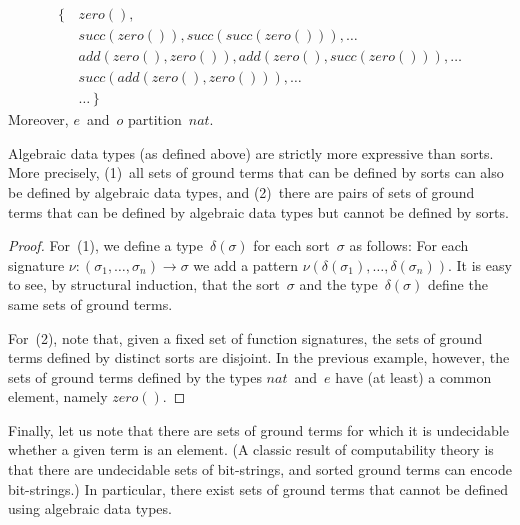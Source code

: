 \documentclass[a4paper,12pt,oneside,fleqn]{book} %
\newcommand{\rg}[1]{\marginpar{\tiny\raggedright\textcolor{blue}{\bf rg:} #1}}
\renewcommand{\rg}{}
\begin{document}
\begin{equation}
\begin{aligned}
\{\,&\mathit{zero}(), \\
    &\mathit{succ}(\mathit{zero}()),
        \mathit{succ}(\mathit{succ}(\mathit{zero}())), \ldots \\
    &\mathit{add}(\mathit{zero}(), \mathit{zero}()),
        \mathit{add}(\mathit{zero}(), \mathit{succ}(\mathit{zero}())),
        \ldots \\
    &\mathit{succ}(\mathit{add}(\mathit{zero}(), \mathit{zero}())),
        \ldots \\
    &\ldots\, \}
\end{aligned}
\end{equation}
Moreover, $e$~and~$o$ partition~$\mathit{nat}$.

\begin{proposition}
Algebraic data types (as defined above) are strictly more expressive than
sorts. More precisely, (1)~all sets of ground terms that can be defined by
sorts can also be defined by algebraic data types, and (2)~there are pairs
of sets of ground terms that can be defined by algebraic data types but
cannot be defined by sorts.
\end{proposition}

\begin{proof}
For~(1), we define a type~$\delta(\sigma)$ for each sort~$\sigma$ as
follows: For each signature $\nu:(\sigma_1,\ldots,\sigma_n)\to\sigma$ we
add a pattern $\nu(\delta(\sigma_1),\ldots,\delta(\sigma_n))$. It is easy
to see, by structural induction, that the sort~$\sigma$ and the
type~$\delta(\sigma)$ define the same sets of ground terms.

For~(2), note that, given a fixed set of function signatures, the sets of
ground terms defined by distinct sorts are disjoint. In the previous
example, however, the sets of ground terms defined by the types
$\mathit{nat}$~and~$e$ have (at least) a common element, namely
$\mathit{zero}()$.
\end{proof}

Finally, let us note that there are sets of ground terms for which it is
undecidable whether a given term is an element.  (A classic result of
computability theory is that there are undecidable sets of bit-strings, and
sorted ground terms can encode bit-strings.) In particular, there exist
sets of ground terms that cannot be defined using algebraic data types.
\end{document}
